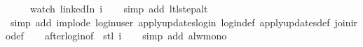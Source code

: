 \begin{isabellebody}
{\ \ \ \ \ {\isacharparenleft}watch\ linkedIn\ i{\isacharparenright}{\isachardoublequoteclose}\isanewline
%
\isadelimproof
\ \ %
\endisadelimproof
%
\isatagproof
{}\isamarkupfalse%
\ {\isacharparenleft}simp\ add{\isacharcolon}\ ltl{\isacharunderscore}step{\isacharunderscore}alt{\isacharparenright}\isanewline
\ \ \isamarkupfalse%
\ {\isacharparenleft}simp\ add{\isacharcolon}\ implode\ login{\isacharunderscore}user\ apply{\isacharunderscore}updates{\isacharunderscore}login\ login{\isacharunderscore}def\ apply{\isacharunderscore}updates{\isacharunderscore}def\ join{\isacharunderscore}iro{\isacharunderscore}def{\isacharparenright}\isanewline
\ \ \isamarkupfalse%
\ after{\isacharunderscore}login{\isacharbrackleft}of\ {\isachardoublequoteopen}{\isacharbrackleft}{\isacharbrackright}{\isachardoublequoteclose}\ {\isachardoublequoteopen}stl\ i{\isachardoublequoteclose}{\isacharbrackright}\isanewline
\ \ \isamarkupfalse%
\ {\isacharparenleft}simp\ add{\isacharcolon}\ alw{\isacharunderscore}mono{\isacharparenright}%
\endisatagproof
{\isafoldproof}%
%
\isadelimproof
%
\endisadelimproof
%
}%
%
\isadelimtheory
%
\endisadelimtheory
%
\isatagtheory
{}\isamarkupfalse%
%
\endisatagtheory
{\isafoldtheory}%
%
\isadelimtheory
%
\endisadelimtheory
%
\end{isabellebody}%
\endinput
